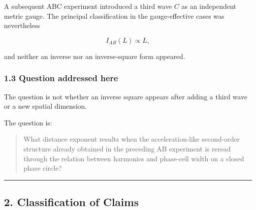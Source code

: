 \documentclass[
  a4paper,
]{article}
\begin{document}
A subsequent ABC experiment introduced a third wave \(C\) as an
independent metric gauge. The principal classification in the
gauge-effective cases was nevertheless

\[
I_{AB}(L)\propto L,
\]

and neither an inverse nor an inverse-square form appeared.

\subsubsection{1.3 Question addressed
here}\label{question-addressed-here}

The question is not whether an inverse square appears after adding a
third wave or a new spatial dimension.

The question is:

\begin{quote}
What distance exponent results when the acceleration-like second-order
structure already obtained in the preceding AB experiment is reread
through the relation between harmonics and phase-cell width on a closed
phase circle?
\end{quote}

\begin{center}\rule{0.5\linewidth}{0.5pt}\end{center}

\subsection{2. Classification of Claims}\label{classification-of-claims}
\end{document}
